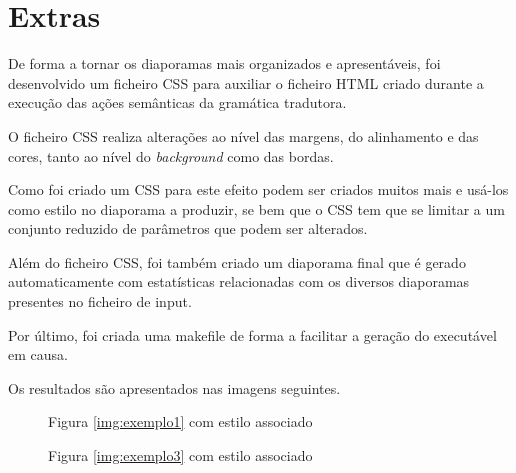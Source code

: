 \documentclass[11pt,a4paper]{report}
\begin{document}
\chapter{Extras}
\label{chap:extras}

De forma a tornar os diaporamas mais organizados e apresentáveis, foi desenvolvido um ficheiro CSS para auxiliar o ficheiro HTML criado durante a execução das ações semânticas da gramática tradutora.

O ficheiro CSS realiza alterações ao nível das margens, do alinhamento e das cores, tanto ao nível do \textit{background} como das bordas.

Como foi criado um CSS para este efeito podem ser criados muitos mais e usá-los como estilo no diaporama a produzir, se bem que o CSS tem que se limitar a um conjunto reduzido de parâmetros que podem ser alterados.

Além do ficheiro CSS, foi também criado um diaporama final que é gerado automaticamente com estatísticas relacionadas com os diversos diaporamas presentes no ficheiro de input.

Por último, foi criada uma makefile de forma a facilitar a geração do executável em causa.

Os resultados são apresentados nas imagens seguintes.

\begin{figure}[H]
\centering
{}
\caption{Figura \ref{img:exemplo1} com estilo associado}
\label{img:exemplo2}
\end{figure}

\begin{figure}[H]
\centering
{}
\caption{Figura \ref{img:exemplo3} com estilo associado}
\label{img:exemplo4}
\end{figure}
\end{document}

